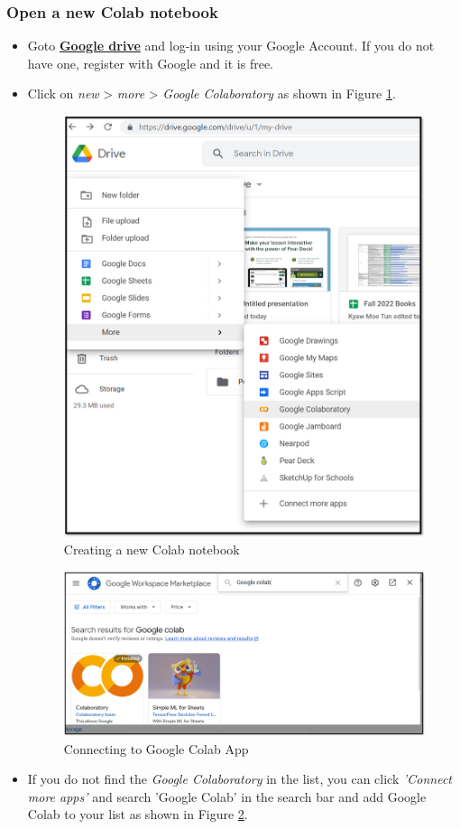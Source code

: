 \subsubsection{\textbf{Open a new Colab notebook}}
\begin{itemize}

  \item Goto \href{https://drive.google.com}{\textbf{Google drive}} and log-in using your Google Account. If you do not have one, register with Google and it is free.
  \item Click on \emph{new} > \emph{more} > \emph{Google Colaboratory} as shown in Figure \ref{fig:colab1}.
  \begin{figure}[h]
  \centering
  \includegraphics[width=5 cm]{colab1.jpg}
  \caption{Creating a new Colab notebook}
  \label{fig:colab1}
  \end{figure}
   \begin{figure}[!h]
  \centering
  \includegraphics[width=4.5 cm]{colab2.jpg}
  \caption{Connecting to Google Colab App}
  \label{fig:colab2}
  \end{figure}
  \item If you do not find the \emph{Google Colaboratory} in the list, you can click \emph{'Connect more apps'} and search 'Google Colab' in the search bar and add Google Colab to your list as shown in Figure \ref{fig:colab2}.
\end{itemize}
